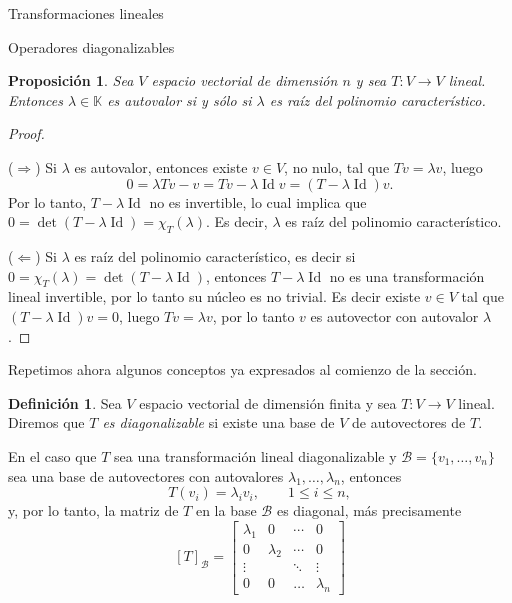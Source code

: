 \documentclass[a4paper,12pt,twoside,spanish,reqno]{amsbook}
\numberwithin{equation}{section}
\newtheorem{proposicion}[teorema]{Proposici\'on}
\theoremstyle{definition}
\newtheorem{definicion}[teorema]{Definici\'on}
\theoremstyle{remark}
\newcommand{\Id}{\operatorname{Id}}
\newcommand{\K}{\mathbb K}
\begin{document}
\begin{chapter}{Transformaciones lineales}
\begin{section}{Operadores diagonalizables}
    

        
        \begin{proposicion}\label{autovalores}
            Sea $V$ espacio vectorial de dimensión $n$ y sea $T: V \to V$ lineal. Entonces $\lambda\in \K$ es autovalor si y sólo si $\lambda$ es raíz del polinomio característico.  
        \end{proposicion}
        \begin{proof}${}^{}$
            
            ($\Rightarrow$) Si $\lambda$ es autovalor, entonces existe $v \in V$, no nulo, tal que $Tv = \lambda v$, luego 
            $$
            0 = \lambda Tv -v  =   Tv - \lambda \Id v =  (T-\lambda \Id)v.
            $$
            Por lo tanto, $T-\lambda \Id$ no es invertible, lo cual implica que $0 = \det(T-\lambda \Id) = \chi_T(\lambda)$. Es decir, $\lambda$ es raíz del polinomio característico. 
            
            ($\Leftarrow$) Si $\lambda$ es raíz del polinomio característico, es decir si $0 = \chi_T(\lambda) = \det(T-\lambda \Id)$, entonces $T-\lambda \Id$ no es una transformación lineal  invertible, por lo tanto  su núcleo es no trivial. Es decir existe $v \in V$ tal que $(T-\lambda \Id)v =0$, luego $Tv =\lambda v$, por lo tanto $v$ es autovector con autovalor $\lambda$.   
        \end{proof}
        
        Repetimos ahora algunos conceptos ya expresados al comienzo de la sección. 
        
        \begin{definicion}
            Sea $V$ espacio vectorial de dimensión finita y sea $T: V \to V$ lineal. Diremos que \textit{$T$ es diagonalizable} si existe una base de $V$ de autovectores de $T$. 
        \end{definicion}	
        
        En el caso que $T$ sea una transformación lineal diagonalizable y $\mathcal{B} = \{v_1,\ldots,v_n \}$ sea una base de autovectores con autovalores $\lambda_1,\ldots,\lambda_n$, entonces
        $$
        T(v_i) = \lambda_i v_i, \qquad 1 \le i \le n,
        $$ 
        y, por lo tanto, la matriz de $T$ en  la base $\mathcal{B}$ es diagonal, más precisamente
        $$
        [T]_\mathcal{B} = \begin{bmatrix}
        \lambda_1 &0 & \cdots & 0 \\
        0 & \lambda_2 & \cdots &0 \\
        \vdots & &\ddots & \vdots \\
        0 & 0 & \ldots &\lambda_n
        \end{bmatrix}
        $$
        

\end{section}
\end{chapter}
\end{document}
